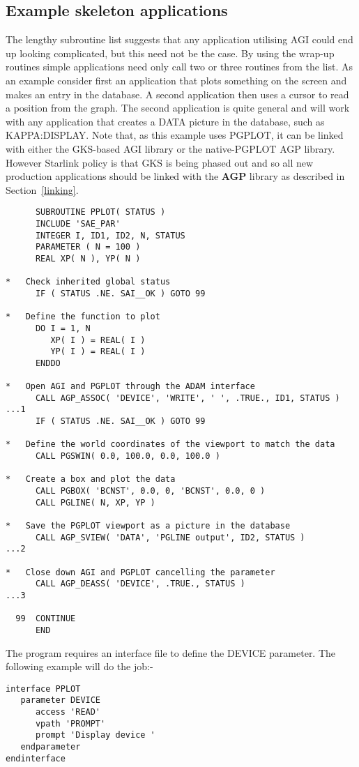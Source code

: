 \documentclass[twoside,11pt]{article}
\newcommand{\hyperref}[4]{#2\ref{#4}#3}
\renewcommand{\_}{\texttt{\symbol{95}}}
\begin{document}
\subsection{Example skeleton applications}\label{exam}

The lengthy subroutine list suggests that any application utilising
AGI could end up looking complicated, but this need not be the case.
By using the wrap-up routines simple applications need only call two
or three routines from the list. As an example consider first an
application that plots something on the screen and makes an entry in
the database. A second application then uses a cursor to read a
position from the graph. The second application is quite general and
will work with any application that creates a DATA picture in the
database, such as KAPPA:DISPLAY. Note that, as this example uses
PGPLOT, it can be linked with either the GKS-based AGI library or the
native-PGPLOT AGP library. However Starlink policy is that GKS is
being phased out and so all new production applications should be
linked with the {\bf AGP} library as described \hyperref{here}{in
Section~}{}{linking}.
\begin{verbatim}
      SUBROUTINE PPLOT( STATUS )
      INCLUDE 'SAE_PAR'
      INTEGER I, ID1, ID2, N, STATUS
      PARAMETER ( N = 100 )
      REAL XP( N ), YP( N )

*   Check inherited global status
      IF ( STATUS .NE. SAI__OK ) GOTO 99

*   Define the function to plot
      DO I = 1, N
         XP( I ) = REAL( I )
         YP( I ) = REAL( I )
      ENDDO

*   Open AGI and PGPLOT through the ADAM interface
      CALL AGP_ASSOC( 'DEVICE', 'WRITE', ' ', .TRUE., ID1, STATUS )     ...1
      IF ( STATUS .NE. SAI__OK ) GOTO 99

*   Define the world coordinates of the viewport to match the data
      CALL PGSWIN( 0.0, 100.0, 0.0, 100.0 )

*   Create a box and plot the data
      CALL PGBOX( 'BCNST', 0.0, 0, 'BCNST', 0.0, 0 )
      CALL PGLINE( N, XP, YP )

*   Save the PGPLOT viewport as a picture in the database
      CALL AGP_SVIEW( 'DATA', 'PGLINE output', ID2, STATUS )            ...2

*   Close down AGI and PGPLOT cancelling the parameter
      CALL AGP_DEASS( 'DEVICE', .TRUE., STATUS )                        ...3

  99  CONTINUE
      END
\end{verbatim}
The program requires an interface file to define the DEVICE parameter.
The following example will do the job:-
\begin{verbatim}
interface PPLOT
   parameter DEVICE
      access 'READ'
      vpath 'PROMPT'
      prompt 'Display device '
   endparameter
endinterface
\end{verbatim}
\end{document}

